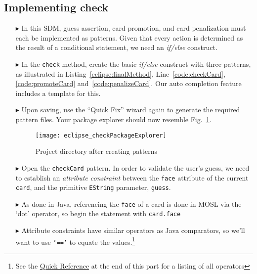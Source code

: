 \newpage
\hypertarget{checkCard tex}{}
\subsection{Implementing check}
\texHeader
 
\begin{itemize}
   
\item[$\blacktriangleright$] In this SDM, guess assertion, card promotion, and card penalization must each be implemented as patterns. Given that every
action is determined as the result of a conditional statement, we need an \emph{if/else} construct.

\item[$\blacktriangleright$] In the \texttt{check} method, create the basic \emph{if/else} construct with three patterns, as illustrated in
Listing~\ref{eclipse:finalMethod}, Line~\ref{code:checkCard}, \ref{code:promoteCard} and~\ref{code:penalizeCard}. Our auto completion feature includes a template for this.

\vspace{0.5cm}

\item[$\blacktriangleright$] Upon saving, use the ``Quick Fix'' wizard again to generate the required pattern files. Your package explorer should now resemble
Fig.~\ref{eclipse:checkPatternsExplorer}.

\begin{figure}[htbp]
\begin{center}
  \texttt{[image: eclipse\_checkPackageExplorer]}
  \caption{Project directory after creating patterns}
  \label{eclipse:checkPatternsExplorer}
\end{center}
\end{figure} 

\item[$\blacktriangleright$] Open the \texttt{checkCard} pattern. In order to validate the user's guess, we need to establish an \emph{attribute constraint}
between the \texttt{face} attribute of the current \texttt{card}, and the primitive \texttt{EString} parameter, \texttt{guess}. 

\item[$\blacktriangleright$] As done in Java, referencing the \texttt{face} of a card is done in MOSL via the `dot' operator, so begin the statement with
\texttt{card.face}

\item[$\blacktriangleright$] Attribute constraints have similar operators as Java comparators, so we'll want to use \texttt{`=='} to equate the
values.\footnote{See the \hyperlink{quickRef}{Quick Reference} at the end of this part for a listing of all operators}


\end{itemize}
